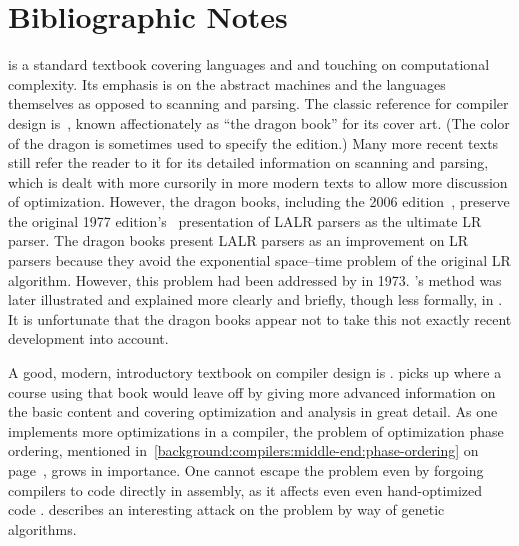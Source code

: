 \section{Bibliographic Notes}\label{background:compilers:bibliographicnotes}
 is a standard textbook covering languages and \TMs and touching on computational complexity. Its emphasis is on the abstract machines and the languages themselves as opposed to scanning and parsing. The classic reference for compiler design is~\citet{Aho:Compilers:2006}, known affectionately as ``the dragon book'' for its cover art. (The color of the dragon is sometimes used to specify the edition.) Many more recent texts still refer the reader to it for its detailed information on scanning and parsing, which is dealt with more cursorily in more modern texts to allow more discussion of optimization. However, the dragon books, including the 2006 edition~\citep{Aho:Compilers:2006}, preserve the original 1977 edition's~\citep{Aho:Principles:1977} presentation of LALR parsers as the ultimate LR parser. The dragon books present LALR parsers as an improvement on LR parsers because they avoid the exponential space--time problem of the original LR algorithm. However, this problem had been addressed by \citet{Pager:The-lane:1973} in 1973. 's method was later illustrated and explained more clearly and briefly, though less formally, in \citet{Spector:Efficient:1988}. It is unfortunate that the dragon books appear not to take this not exactly recent development into account.

A good, modern, introductory textbook on compiler design is \citet{Cooper:Engineering:2004}.  picks up where a course using that book would leave off by giving more advanced information on the basic content and covering optimization and analysis in great detail. As one implements more optimizations in a compiler, the problem of optimization phase ordering, mentioned in~\ref{background:compilers:middle-end:phase-ordering} on page~\pageref{background:compilers:middle-end:phase-ordering}, grows in importance. One cannot escape the problem even by forgoing compilers to code directly in assembly, as it affects even even hand-optimized code \citep{Hines:Using:2005}.  describes an interesting attack on the problem by way of genetic algorithms.

